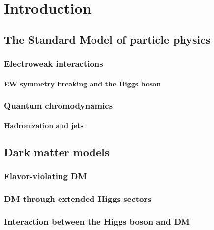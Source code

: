 \chapter{Introduction}

\section{The Standard Model of particle physics}

\subsection{Electroweak interactions}

\subsubsection{EW symmetry breaking and the Higgs boson}

\subsection{Quantum chromodynamics}

\subsubsection{Hadronization and jets}

\section{Dark matter models}

\subsection{Flavor-violating DM}

\subsection{DM through extended Higgs sectors}

\subsection{Interaction between the Higgs boson and DM}

